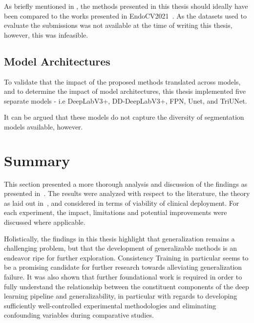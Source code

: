 As briefly mentioned in , the methods presented in this thesis should ideally have been compared to the works presented in EndoCV2021~\cite{endocv2021}. As the datasets used to evaluate the submissions was not available at the time of writing this thesis, however, this was infeasible. 

\subsection{Model Architectures}
To validate that the impact of the proposed methods translated across models, and to determine the impact of model architectures, this thesis implemented five separate models - i.e DeepLabV3+, DD-DeepLabV3+, FPN, Unet, and TriUNet. 

It can be argued that these models do not capture the diversity of segmentation models available, however.

\section{Summary}
This section presented a more thorough analysis and discussion of the findings as presented in~. The results were analyzed with respect to the literature, the theory as laid out in~, and considered in terms of viability of clinical deployment. For each experiment, the impact, limitations and potential improvements were discussed where applicable. 

Holistically, the findings in this thesis highlight that generalization remains a challenging problem, but that the development of generalizable methods is an endeavor ripe for further exploration. Consistency Training in particular seems to be a promising candidate for further research towards alleviating generalization failure. It was also shown that further foundational work is required in order to fully understand the relationship between the constituent components of the deep learning pipeline and generalizability, in particular with regards to developing sufficiently well-controlled experimental methodologies and eliminating confounding variables during comparative studies. 